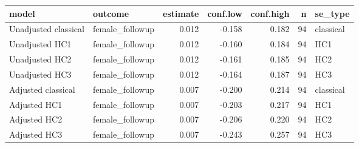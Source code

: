 
\begin{tabular}{llrrrrl}
\toprule
model & outcome & estimate & conf.low & conf.high & n & se\_type\\
\midrule
Unadjusted classical & female\_followup & 0.012 & -0.158 & 0.182 & 94 & classical\\
Unadjusted HC1 & female\_followup & 0.012 & -0.160 & 0.184 & 94 & HC1\\
Unadjusted HC2 & female\_followup & 0.012 & -0.161 & 0.185 & 94 & HC2\\
Unadjusted HC3 & female\_followup & 0.012 & -0.164 & 0.187 & 94 & HC3\\
Adjusted classical & female\_followup & 0.007 & -0.200 & 0.214 & 94 & classical\\
\addlinespace
Adjusted HC1 & female\_followup & 0.007 & -0.203 & 0.217 & 94 & HC1\\
Adjusted HC2 & female\_followup & 0.007 & -0.206 & 0.220 & 94 & HC2\\
Adjusted HC3 & female\_followup & 0.007 & -0.243 & 0.257 & 94 & HC3\\
\bottomrule
\end{tabular}
